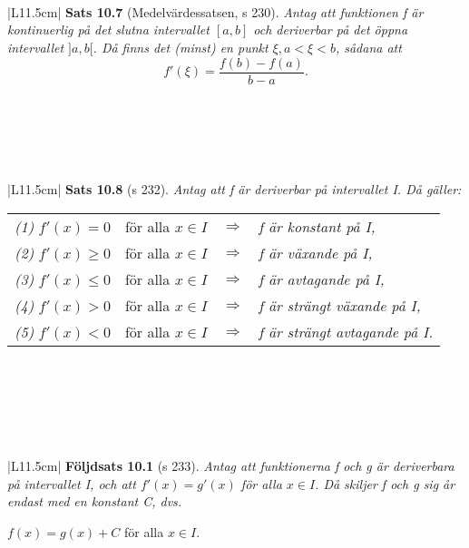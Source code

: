 \documentclass[a4paper]{article}
\begin{document}
\\\\\\
\begin{tabular}{|L{11.5cm}|} \hline
\textbf{Sats 10.7} (Medelvärdessatsen, s 230).
\textit{Antag att funktionen f är kontinuerlig på det slutna intervallet $[a,b]$ och deriverbar på det öppna intervallet $]a,b[$. Då finns det (minst) en punkt $\xi, a < \xi < b$, sådana att}
\begin{displaymath}
f'(\xi) = \frac{f(b)-f(a)}{b-a}.
\end{displaymath}
\\\hline
\end{tabular}
\\\\\\
\begin{tabular}{|L{11.5cm}|} \hline
\textbf{Sats 10.8} (s 232).
\textit{Antag att f är deriverbar på intervallet I. Då gäller:}
\begin{tabular}{llll}
\textit{(1)} $f'(x)=0$ & för alla $x\in I$ & $\Rightarrow$ & \textit{f är konstant på I,}\\
\textit{(2)} $f'(x)\geq0$ & för alla $x\in I$ & $\Rightarrow$ & \textit{f är växande på I,} \\
\textit{(3)} $f'(x)\leq0$ & för alla $x\in I$ & $\Rightarrow$ & \textit{f är avtagande på I,} \\
\textit{(4)} $f'(x)>0$ & för alla $x\in I$ & $\Rightarrow$ & \textit{f är strängt växande på I,} \\
\textit{(5)} $f'(x)<0$ & för alla $x\in I$ & $\Rightarrow$ & \textit{f är strängt avtagande på I.}
\end{tabular}
\\\hline
\end{tabular}
\\\\\\
\begin{tabular}{|L{11.5cm}|} \hline
\textbf{Följdsats 10.1} (s 233).
\textit{Antag att funktionerna f och g är deriverbara på intervallet I, och att $f'(x)=g'(x)$ för alla $x\in I$. Då skiljer f och g sig år endast med en konstant C, dvs.}

\vspace{0.2cm}
\hspace{3cm}$f(x) = g(x) + C$ \hspace{1cm} för alla $x\in I$.
\\\hline
\end{tabular}
\end{document}
